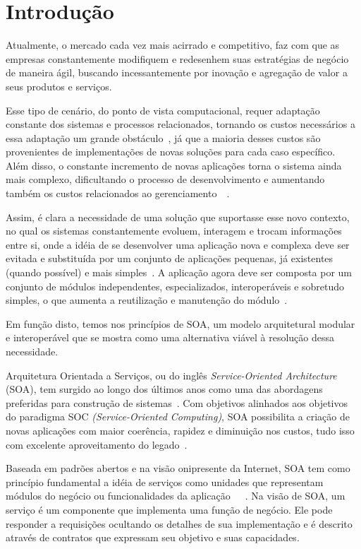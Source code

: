 \chapter{Introdução}

Atualmente, o mercado cada vez mais acirrado e competitivo, faz com que as empresas constantemente modifiquem e redesenhem suas estratégias de negócio de maneira ágil, buscando incessantemente por inovação e agregação de valor a seus produtos e serviços. 

Esse tipo de cenário, do ponto de vista computacional, requer adaptação constante dos sistemas e processos relacionados, tornando os custos necessários a essa adaptação um grande obstáculo~\cite{rabelo2006}, já que a maioria desses custos são provenientes de implementações de novas soluções para cada caso específico. Além disso, o constante incremento de novas aplicações torna o sistema ainda mais complexo, dificultando o processo de desenvolvimento e aumentando também os custos relacionados ao gerenciamento~\cite{rabelo2006}~\cite{ada2006}.

Assim, é clara a necessidade de uma solução que suportasse esse novo contexto, no qual os sistemas constantemente evoluem, interagem e trocam informações entre si, onde a idéia de se desenvolver uma aplicação nova e complexa deve ser evitada e substituída por um conjunto de aplicações pequenas, já existentes (quando possível) e mais simples~\cite{rabelo2006}. A aplicação agora deve ser composta por um conjunto de módulos independentes, especializados, interoperáveis e sobretudo simples, o que aumenta a reutilização e manutenção do módulo~\cite{oracle2005ws}.

Em função disto, temos nos princípios de SOA, um modelo arquitetural modular e interoperável que se mostra como uma alternativa viável à resolução dessa necessidade.

Arquitetura Orientada a Serviços, ou do inglês \textit{Service-Oriented Architecture} (SOA), tem surgido ao longo dos últimos anos como uma das abordagens preferidas para construção de sistemas~\cite{erl2008soa}. Com objetivos alinhados aos objetivos do paradigma SOC \textit{(Service-Oriented Computing)}, SOA possibilita a criação de novas aplicações com maior coerência, rapidez e diminuição nos custos, tudo isso com excelente aproveitamento do legado~\cite{erl2008soa}.

Baseada em padrões abertos e na visão onipresente da Internet, SOA tem como princípio fundamental a idéia de serviços como unidades que representam módulos do negócio ou funcionalidades da aplicação~\cite{erl2008soa}~\cite{imb2007soa}~\cite{cervantes2005technical}. Na visão de SOA, um serviço é um componente que implementa uma função de negócio. Ele pode responder a requisições ocultando os detalhes de sua implementação e é descrito através de contratos que expressam seu objetivo e suas capacidades. 


